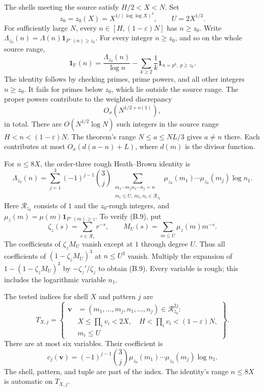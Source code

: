 The shells meeting the source satisfy $H/2<X<N$. Set
\[
 z_0=z_0(X)=X^{1/(\log\log X)^3},\qquad U=2X^{1/3}.
\]
For sufficiently large $N$, every $n\in[H,(1-\varepsilon)N]$ has $n\ge z_0$.
Write $\Lambda_{z_0}(n)=\Lambda(n)\mathbf1_{P^-(n)\ge z_0}$.
For every integer $n\ge z_0$, and so on the whole source range,
\[
 \mathbf1_{\mathbb P}(n)=\frac{\Lambda_{z_0}(n)}{\log n}
 -\sum_{k\ge2}\frac1k\mathbf1_{n=p^k,\ p\ge z_0}.
 \tag{B.7}
\]
The identity follows by checking primes, prime powers, and all other
integers $n\ge z_0$. It fails for primes below $z_0$, which lie
outside the source range. The proper powers contribute to the weighted discrepancy
\[
 O_\sigma(N^{1/2+o(1)}),
 \tag{B.8}
\]
in total. There are $O(N^{1/2}\log N)$ such integers in the source
range $H<n<(1-\varepsilon)N$. The theorem's range
$N\le a\le NL/3$ gives $a\ne n$ there. Each contributes
at most $O_\sigma(d(a-n)+L)$, where $d(m)$ is the divisor function.

For $n\le 8X$, the order-three rough Heath--Brown identity is
\[
 \Lambda_{z_0}(n)=\sum_{j=1}^3(-1)^{j-1}\binom3j
 \sum_{\substack{m_1\cdots m_jn_1\cdots n_j=n\\
                   m_i\le U,\ m_i,n_i\in\mathcal R_{z_0}}}
 \mu_{z_0}(m_1)\cdots\mu_{z_0}(m_j)\log n_1.
 \tag{B.9}
\]
Here $\mathcal R_{z_0}$ consists of $1$ and the $z_0$-rough integers,
and $\mu_z(m)=\mu(m)\mathbf1_{P^-(m)\ge z}$.
To verify (B.9), put
\[
 \zeta_z(s)=\sum_{r\in\mathcal R_z}r^{-s},\qquad
 M_U(s)=\sum_{m\le U}\mu_z(m)m^{-s}.
\]
The coefficients of $\zeta_zM_U$ vanish except at $1$ through degree
$U$. Thus all coefficients of $(1-\zeta_zM_U)^3$ at $n\le U^3$ vanish. Multiply the expansion of $1-(1-\zeta_zM_U)^3$ by
$-\zeta_z'/\zeta_z$ to obtain (B.9). Every variable is rough; this
includes the logarithmic variable $n_1$.

The tested indices for shell $X$ and pattern $j$ are
\[
 T_{X,j}=\left\{
 \begin{aligned}
 \mathbf v&=(m_1,\ldots,m_j,n_1,\ldots,n_j)
             \in\mathcal R_{z_0}^{2j}:\\
 &X\le\prod_i v_i<2X,\quad
   H<\prod_i v_i<(1-\varepsilon)N,\\
 &m_i\le U
 \end{aligned}\right\}.
 \tag{B.10}
\]
There are at most six variables. Their coefficient is
\[
 c_j(\mathbf v)=(-1)^{j-1}\binom3j
 \mu_{z_0}(m_1)\cdots\mu_{z_0}(m_j)\log n_1.
\]
The shell, pattern, and tuple are part of the index. The identity's
range $n\le8X$ is automatic on $T_{X,j}$.

